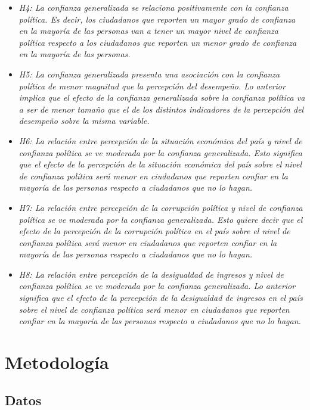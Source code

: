 \documentclass[12pt,twoside]{templates/facsothesis}
\begin{document}
\begin{itemize}
\item
  \emph{H4: La confianza generalizada se relaciona positivamente con la confianza política. Es decir, los ciudadanos que reporten un mayor grado de confianza en la mayoría de las personas van a tener un mayor nivel de confianza política respecto a los ciudadanos que reporten un menor grado de confianza en la mayoría de las personas.}
\item
  \emph{H5: La confianza generalizada presenta una asociación con la confianza política de menor magnitud que la percepción del desempeño. Lo anterior implica que el efecto de la confianza generalizada sobre la confianza política va a ser de menor tamaño que el de los distintos indicadores de la percepción del desempeño sobre la misma variable.}
\item
  \emph{H6: La relación entre percepción de la situación económica del país y nivel de confianza política se ve moderada por la confianza generalizada. Esto significa que el efecto de la percepción de la situación económica del país sobre el nivel de confianza política será menor en ciudadanos que reporten confiar en la mayoría de las personas respecto a ciudadanos que no lo hagan.}
\item
  \emph{H7: La relación entre percepción de la corrupción política y nivel de confianza política se ve moderada por la confianza generalizada. Esto quiere decir que el efecto de la percepción de la corrupción política en el país sobre el nivel de confianza política será menor en ciudadanos que reporten confiar en la mayoría de las personas respecto a ciudadanos que no lo hagan.}
\item
  \emph{H8: La relación entre percepción de la desigualdad de ingresos y nivel de confianza política se ve moderada por la confianza generalizada. Lo anterior significa que el efecto de la percepción de la desigualdad de ingresos en el país sobre el nivel de confianza política será menor en ciudadanos que reporten confiar en la mayoría de las personas respecto a ciudadanos que no lo hagan.}
\end{itemize}

\chapter{Metodología}\label{metodologuxeda}

\section{Datos}\label{datos}
\end{document}
